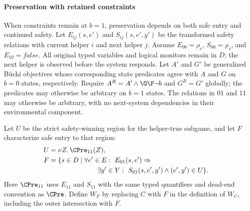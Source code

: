 \paragraph{Preservation with retained constraints}
When constraints remain at $b=1$, preservation depends on both
safe entry and continued safety.
Let $E_{ij}(s,e')$ and $S_{ij}(s,e',y')$ be the transformed safety
relations with current helper $i$ and next helper $j$.
Assume $E_{00}=\rho_e$, $S_{00}=\rho_s$, and $E_{10}=\mathit{false}$.
All original typed variables and logical monitors remain in $D$;
the next helper is observed before the system responds.
Let $A'$ and $G'$ be generalized B\"uchi objectives whose corresponding
state predicates agree with $A$ and $G$ on $b=0$ states, respectively.
Require $A^R=A'\land\G\F\neg b$ and $G^R=G'$ globally;
the predicates may otherwise be arbitrary on $b=1$ states.
The relations in $01$ and $11$ may otherwise be arbitrary, with
no next-system dependencies in their environmental component.

Let $U$ be the strict safety-winning region for the helper-true
subgame, and let $F$ characterize safe entry to that region:
\begin{align}
 U &= \nu Z.\,\CPre_{11}(Z),\label{eq:helper-U}\\
 F &= \{s\in D\mid\forall e'\in E:\ E_{01}(s,e')\Rightarrow{}\nonumber\\
   &\hspace{25mm}\exists y'\in Y:\ S_{01}(s,e',y')\land(e',y')\in U\}.
 \label{eq:helper-F}
\end{align}
Here $\CPre_{11}$ uses $E_{11}$ and $S_{11}$ with the same typed
quantifiers and dead-end convention as $\CPre$.
Define $W_F$ by replacing $C$ with $F$ in the definition of $W_C$,
including the outer intersection with $F$.

